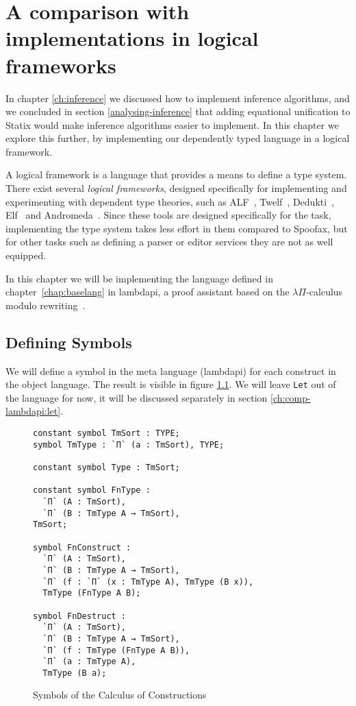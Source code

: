 \chapter{A comparison with implementations in logical frameworks}
\label{ch:comp-lambdapi}

In chapter \ref{ch:inference} we discussed how to implement inference algorithms, and we concluded in section \ref{analysing-inference} that adding equational unification to Statix would make inference algorithms easier to implement. In this chapter we explore this further, by implementing our dependently typed language in a logical framework. 

A logical framework is a language that provides a means to define a type system. There exist several \emph{logical frameworks}, designed specifically for implementing and experimenting with dependent type theories, such as ALF~\cite{MagnussonN93}, Twelf~\cite{PfenningS99}, Dedukti~\cite{BoespflugCH12}, Elf~\cite{pfenning_1991} and Andromeda~\cite{BauerHP20}. Since these tools are designed specifically for the task, implementing the type system takes less effort in them compared to Spoofax, but for other tasks such as defining a parser or editor services they are not as well equipped. 

In this chapter we will be implementing the language defined in chapter~\ref{chap:baselang} in lambdapi, a proof assistant based on the $\lambda \Pi$-calculus modulo rewriting~\cite{BoespflugCH12}. 

\section{Defining Symbols}

We will define a symbol in the meta language (lambdapi) for each construct in the object language. The result is visible in figure \ref{fig:lp-symbols}. We will leave \verb|Let| out of the language for now, it will be discussed separately in section \ref{ch:comp-lambdapi:let}.

\begin{figure}[ht]
\begin{lstlisting}
constant symbol TmSort : TYPE;
symbol TmType : `Π` (a : TmSort), TYPE;

constant symbol Type : TmSort;

constant symbol FnType :
  `Π` (A : TmSort), 
  `Π` (B : TmType A → TmSort), 
TmSort;

symbol FnConstruct :
  `Π` (A : TmSort), 
  `Π` (B : TmType A → TmSort), 
  `Π` (f : `Π` (x : TmType A), TmType (B x)), 
  TmType (FnType A B);

symbol FnDestruct :
  `Π` (A : TmSort), 
  `Π` (B : TmType A → TmSort), 
  `Π` (f : TmType (FnType A B)),
  `Π` (a : TmType A),
  TmType (B a);
\end{lstlisting}
	\caption{Symbols of the Calculus of Constructions}
\label{fig:lp-symbols}
\end{figure}

